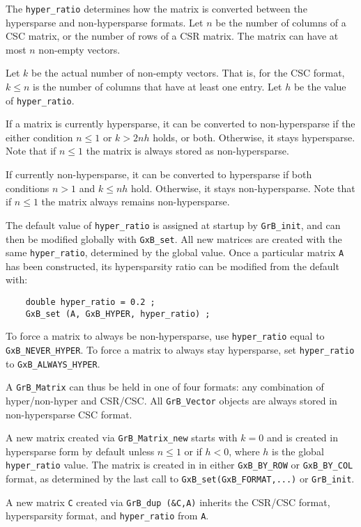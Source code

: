 \documentclass[12pt]{article}
\begin{document}
The \verb'hyper_ratio' determines how the matrix is converted between the
hypersparse and non-hypersparse formats.  Let $n$ be the number of columns of a
CSC matrix, or the number of rows of a CSR matrix.  The matrix can have at most
$n$ non-empty vectors.

Let $k$ be the actual number of non-empty vectors.  That is, for the CSC
format, $k \le n$ is the number of columns that have at least one entry.  Let
$h$ be the value of \verb'hyper_ratio'.

If a matrix is currently hypersparse, it can be converted to non-hypersparse if
the either condition $n \le 1$ or $k > 2nh$ holds, or both.  Otherwise, it
stays hypersparse.  Note that if $n \le 1$ the matrix is always stored as
non-hypersparse.

If currently non-hypersparse, it can be converted to hypersparse if
both conditions $n > 1$ and $k \le nh$ hold.  Otherwise, it stays
non-hypersparse.  Note that if $n \le 1$ the matrix always remains
non-hypersparse.

The default value of \verb'hyper_ratio' is assigned at startup by
\verb'GrB_init', and can then be modified globally with \verb'GxB_set'.  All
new matrices are created with the same \verb'hyper_ratio', determined by the
global value.  Once a particular matrix \verb'A' has been constructed, its
hypersparsity ratio can be modified from the default with:

    {\footnotesize
    \begin{verbatim}
    double hyper_ratio = 0.2 ;
    GxB_set (A, GxB_HYPER, hyper_ratio) ; \end{verbatim}}

To force a matrix to always be non-hypersparse, use \verb'hyper_ratio' equal to
\verb'GxB_NEVER_HYPER'.  To force a matrix to always stay hypersparse, set
\verb'hyper_ratio' to \verb'GxB_ALWAYS_HYPER'.

A \verb'GrB_Matrix' can thus be held in one of four formats: any combination of
hyper/non-hyper and CSR/CSC.  All \verb'GrB_Vector' objects are always stored
in non-hypersparse CSC format.

A new matrix created via \verb'GrB_Matrix_new' starts with $k=0$ and is created
in hypersparse form by default unless $n \le 1$ or if $h<0$, where $h$ is the
global \verb'hyper_ratio' value.  The matrix is created in in either
\verb'GxB_BY_ROW' or \verb'GxB_BY_COL' format, as determined by the last call
to \verb'GxB_set(GxB_FORMAT,...)' or \verb'GrB_init'.

A new matrix \verb'C' created via \verb'GrB_dup (&C,A)' inherits the CSR/CSC
format, hypersparsity format, and \verb'hyper_ratio' from \verb'A'.
\end{document}
